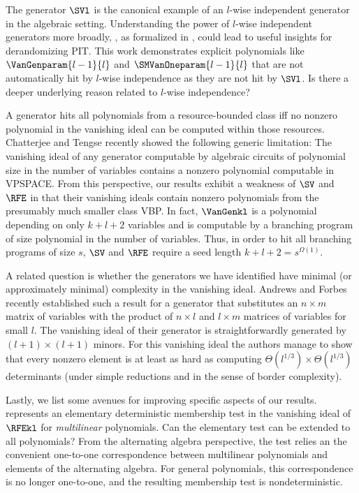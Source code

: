The generator $\SVl$ is the canonical example of an $l$-wise independent generator in the algebraic setting. Understanding the power of $l$-wise independent generators more broadly, \eg, as formalized in \cite{FSTW21, MediniShpilka2021}, could lead to useful insights for derandomizing PIT. This work demonstrates explicit polynomials like \(\VanGenparam{l-1}{l}\) and \(\SMVanOneparam{l-1}{l}\) that are not automatically hit by \(l\)-wise independence as they are not hit by \(\SVl\). Is there a deeper underlying reason related to $l$-wise independence?

A generator hits all polynomials from a resource-bounded class iff no nonzero polynomial in the vanishing ideal can be computed within those resources. Chatterjee and Tengse \cite{CT2023} recently showed the following generic limitation: The vanishing ideal of any generator computable by algebraic circuits of polynomial size in the number of variables contains a nonzero polynomial computable in VPSPACE. From this perspective, our results exhibit a weakness of $\SV$ and $\RFE$ in that their vanishing ideals contain nonzero polynomials from the presumably much smaller class VBP. In fact, $\VanGenkl$ is a polynomial depending on only $k+l+2$ variables and is computable by a branching program of size polynomial in the number of variables. Thus, in order to hit all branching programs of size $s$, $\SV$ and $\RFE$ require a seed length $k+l+2=s^{\Omega(1)}$. 

A related question is whether the generators we have identified have minimal (or approximately minimal) complexity in the vanishing ideal. Andrews and Forbes \cite{AndrewsForbes2022} recently established such a result for a generator that substitutes an $n\times m$ matrix of variables with the product of $n\times l$ and $l \times m$ matrices of variables for small $l$. The vanishing ideal of their generator is straightforwardly generated by $(l+1) \times (l+1)$ minors. For this vanishing ideal the authors manage to show that every nonzero element is at least as hard as computing $\Theta(l^{1/3})\times \Theta(l^{1/3})$ determinants (under simple reductions and in the sense of border complexity). 

Lastly, we list some avenues for improving specific aspects of our results.  represents an elementary deterministic membership test in the vanishing ideal of $\RFEkl$ for \emph{multilinear} polynomials. Can the elementary test can be extended to all polynomials? From the alternating algebra perspective, the test relies an the convenient one-to-one correspondence between multilinear polynomials and elements of the alternating algebra. For general polynomials, this correspondence is no longer one-to-one, and the resulting membership test is nondeterministic.

